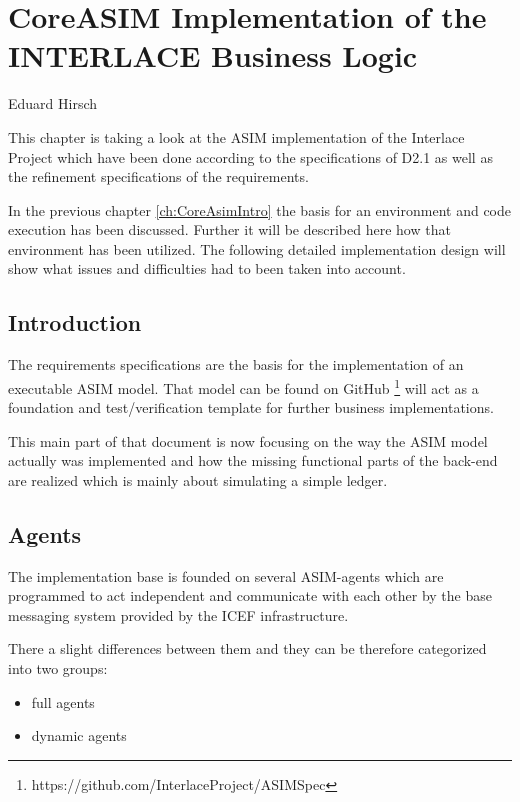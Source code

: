 \chapter{CoreASIM Implementation of the INTERLACE Business Logic}
\label{ch:CoreAsimImplementation}

\vspace{-1cm}
\begin{center}
Eduard Hirsch
\end{center}

This chapter is taking a look at the ASIM implementation of the Interlace Project which have been done according to the specifications of D2.1 as well as the refinement specifications of the requirements.

In the previous chapter \ref{ch:CoreAsimIntro} the basis for an environment and code execution has been discussed. Further it will be described here how that environment has been utilized. The following detailed implementation design will show what issues and difficulties had to been taken into account.


\section{Introduction}
\label{sec:impl_intro}

The requirements specifications are the basis for the implementation of an executable ASIM model. That model can be found on GitHub \footnote{https://github.com/InterlaceProject/ASIMSpec} will act as a foundation and test/verification template for further business implementations.

This main part of that document is now focusing on the way the ASIM model actually was implemented and how the missing functional parts of the back-end are realized which is mainly about simulating a simple ledger.

\section{Agents}

The implementation base is founded on several ASIM-agents which are programmed to act independent and communicate with each other by the base messaging system provided by the ICEF infrastructure.

There a slight differences between them and they can be therefore categorized into two groups:

\begin{itemize}
	\item full agents
	\item dynamic agents
\end{itemize}

